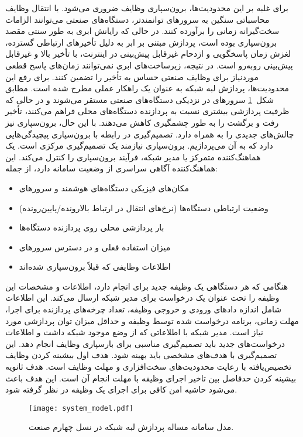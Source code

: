برای غلبه بر این محدودیت‌ها، برون‌سپاری وظایف ضروری می‌شود. با انتقال وظایف محاسباتی سنگین به سرورهای توانمندتر، دستگاه‌های صنعتی می‌توانند الزامات سخت‌گیرانه زمانی را برآورده کنند. در حالی که رایانش ابری به طور سنتی مقصد برون‌سپاری بوده است، پردازش مبتنی بر ابر به دلیل تأخیرهای ارتباطی گسترده، لغزش زمان پاسخگویی و ازدحام غیرقابل پیش‌بینی در اینترنت، با تأخیر بالا و غیرقابل پیش‌بینی روبه‌رو است. در نتیجه، زیرساخت‌های ابری نمی‌توانند زمان‌های پاسخ قطعی موردنیاز برای وظایف صنعتی حساس به تأخیر را تضمین کنند. برای رفع این محدودیت‌ها، پردازش لبه شبکه به عنوان یک راهکار عملی مطرح شده است. مطابق شکل~\ref{figure:system_model} سرورهای  در نزدیکی دستگاه‌های صنعتی مستقر می‌شوند و در حالی که ظرفیت پردازشی بیشتری نسبت به پردازنده دستگاه‌های محلی فراهم می‌کنند، تأخیر رفت و برگشت را به طور چشمگیری کاهش می‌دهند. با این حال، برون‌سپاری نیز چالش‌های جدیدی را به همراه دارد. تصمیم‌گیری در رابطه با برون‌سپاری پیچیدگی‌هایی دارد که به آن می‌پردازیم. برون‌سپاری نیازمند یک تصمیم‌گیری مرکزی‌ است. یک هماهنگ‌کننده متمرکز یا مدیر شبکه، فرآیند برون‌سپاری را کنترل می‌کند. این هماهنگ‌کننده آگاهی سراسری از وضعیت سامانه دارد، از جمله:

\begin{itemize}
\item
مکان‌های فیزیکی دستگاه‌های هوشمند و سرورهای 
\item
وضعیت ارتباطی دستگاه‌ها (نرخ‌های انتقال در ارتباط بالارونده/پایین‌رونده)
\item
بار پردازشی محلی روی پردازنده دستگاه‌ها
\item
میزان استفاده فعلی و در دسترس سرورهای 
\item
اطلاعات وظایفی که قبلاً برون‌سپاری شده‌اند
\end{itemize}

هنگامی که هر دستگاهی یک وظیفه جدید برای انجام دارد، اطلاعات و مشخصات این وظیفه را تحت عنوان یک درخواست برای مدیر شبکه ارسال می‌کند. این اطلاعات شامل اندازه داد‌های ورودی و خروجی وظیفه، تعداد چرخه‌های پردازنده برای اجرا،‌ مهلت زمانی، برنامه درخواست شده توسط وظیفه و حداقل میزان توان پردازشی مورد نیاز است. مدیر شبکه با اطلاعاتی که از وضع موجود شبکه داشت و اطلاعات درخواست‌های جدید باید تصمیم‌گیری مناسبی برای بارسپاری وظایف انجام دهد. این تصمیم‌گیری با هدف‌های مشخصی باید بهینه شود. هدف اول بیشینه کردن وظایف تخصیص‌یافته با رعایت محدودیت‌های سخت‌افزاری و مهلت وظایف است. هدف ثانویه بیشینه کردن حدفاصل بین تاخیر اجرای وظیفه با مهلت انجام آن است. این هدف باعث می‌شود حاشیه امن کافی برای اجرای یک وظیفه در نظر گرفته شود.

\vspace{0.5cm}
\begin{figure}[h]
\centering
\texttt{[image: system\_model.pdf]}
\caption{مدل سامانه مساله پردازش لبه شبکه در نسل چهارم صنعت.}
\label{figure:system_model}
\end{figure}
\vspace{0.5cm}

